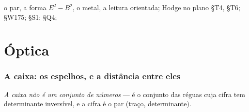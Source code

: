 \documentclass[livro.tex]{subfiles}
\begin{document}
        {o par, a forma $E^{2}-B^{2}$, o metal, a leitura orientada; Hodge no plano}
        { §T4, §T6;  §W175;  §S1;  §Q4; }

\part{Óptica}

\section{A caixa: os espelhos, e a distância entre eles}\label{fis:caixa}

\noindent \emph{A caixa não é um conjunto de números} --- é o conjunto das réguas
cuja cifra tem determinante inversível, e a cifra é o par (traço, determinante).
\end{document}
